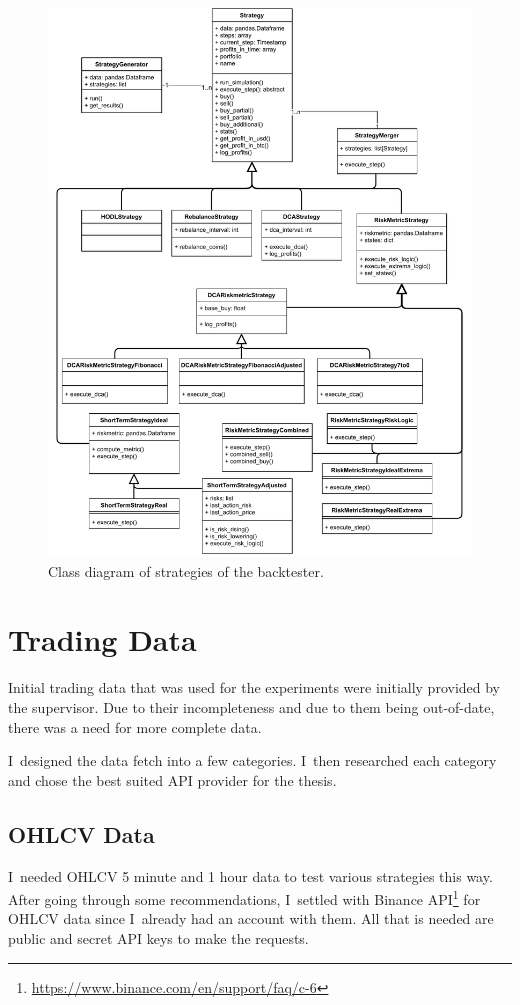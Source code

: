 \begin{figure}[!t]
    \centering
    \includegraphics[width=\columnwidth]{figures/strategy-class-diagram.pdf}
    \caption{Class diagram of strategies of the backtester.}
    \label{figure-strategy-class-diagram}
\end{figure}


\section{Trading Data}
Initial trading data that was used for the experiments were initially provided by the supervisor. Due to their incompleteness and due to them being out-of-date, there was a need for more complete data.

I~designed the data fetch into a few categories. I~then researched each category and chose the best suited API provider for the thesis.

\subsection*{OHLCV Data}
I~needed OHLCV 5 minute and 1 hour data to test various strategies this way. After going through some recommendations, I~settled with Binance API\footnote{\url{https://www.binance.com/en/support/faq/c-6}} for OHLCV data since I~already had an account with them. All that is needed are public and secret API keys to make the requests.

